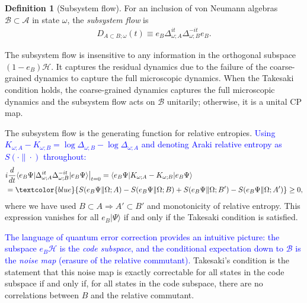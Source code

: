 \documentclass[a4paper,11pt]{article}
\theoremstyle{definition}
\newtheorem{definition}{Definition}[section]
\theoremstyle{remark}
\newcommand{\mA}{\mathcal{A}}
\newcommand{\mB}{\mathcal{B}}
\newcommand{\mH}{\mathcal{H}}
\begin{document}
\begin{definition}[Subsystem flow]\label{def:subsystemflow}
   For an inclusion of von Neumann algebras $\mB\subset \mA$ in state $\omega$, the
   \emph{subsystem flow} is
\begin{align}
    D_{A\subset B;\omega}(t)\equiv e_B\Delta_{\omega;A}^{it}\Delta_{\omega;B}^{-it}e_B.
\end{align}
\end{definition}
 
The subsystem flow is insensitive to any information in the orthogonal subspace
$(1-e_B)\mH$.  It captures the residual dynamics due to the failure of the
coarse-grained dynamics to capture the full microscopic dynamics.  When the Takesaki
condition holds, the coarse-grained dynamics captures the full microscopic dynamics and
the subsystem flow acts on $\mB$ unitarily; otherwise, it is a unital CP map.
 
The subsystem flow is the generating function for relative entropies.
\textcolor{blue}{Using $K_{\omega;A}-K_{\omega;B}=\log\Delta_{\omega;B}-\log\Delta_{\omega;A}$
and denoting Araki relative entropy as $S(\cdot\|\cdot)$ throughout:}
\begin{align}\label{eq:subsystem-flow-entropy}
    &i\frac{d}{dt}\langle e_B\Psi|\Delta_{\omega;A}^{it}\Delta_{\omega;B}^{-it}|e_B\Psi\rangle\big|_{t=0}
    =\langle e_B\Psi|K_{\omega;A}-K_{\omega;B}|e_B\Psi\rangle\nonumber\\
    &=\textcolor{blue}{S(e_B\Psi\|\Omega;A)-S(e_B\Psi\|\Omega;B)+S(e_B\Psi\|\Omega;B')-S(e_B\Psi\|\Omega;A')}
    \geq 0,
\end{align}
where we have used $B\subset A \Rightarrow A'\subset B'$ and monotonicity of relative
entropy.  This expression vanishes for all $e_B|\Psi\rangle$ if and only if the Takesaki
condition is satisfied.
 
\textcolor{blue}{The language of quantum error correction provides an intuitive picture: the
subspace $e_B\mH$ is the \emph{code subspace}, and the conditional expectation down to
$\mB$ is the \emph{noise map} (erasure of the relative commutant).}
Takesaki's condition is the statement that this noise map is exactly correctable for
all states in the code subspace if and only if, for all states in the code subspace,
there are no correlations between $B$ and the relative commutant.
 
\end{document}
